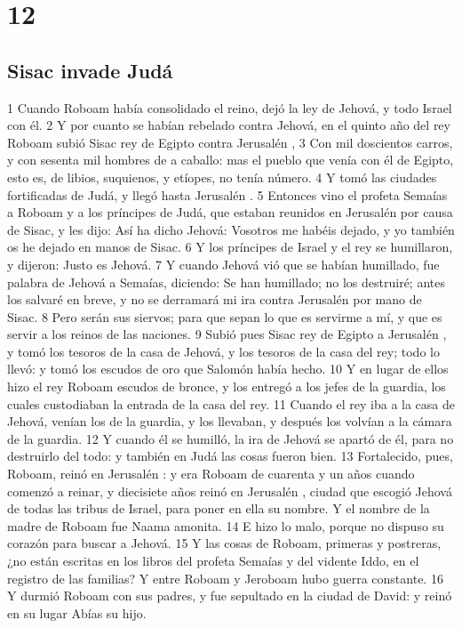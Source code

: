 \chapter{12}

\section*{Sisac invade Judá}

1 Cuando Roboam había consolidado el reino, dejó la ley de Jehová, y todo Israel con él.
2 Y por cuanto se habían rebelado contra Jehová, en el quinto año del rey Roboam subió Sisac rey de Egipto contra Jerusalén ,
3 Con mil doscientos carros, y con sesenta mil hombres de a caballo: mas el pueblo que venía con él de Egipto, esto es, de libios, suquienos, y etíopes, no tenía número.
4 Y tomó las ciudades fortificadas de Judá, y llegó hasta Jerusalén .
5 Entonces vino el profeta Semaías a Roboam y a los príncipes de Judá, que estaban reunidos en Jerusalén  por causa de Sisac, y les dijo: Así ha dicho Jehová: Vosotros me habéis dejado, y yo también os he dejado en manos de Sisac.
6 Y los príncipes de Israel y el rey se humillaron, y dijeron: Justo es Jehová.
7 Y cuando Jehová vió que se habían humillado, fue palabra de Jehová a Semaías, diciendo: Se han humillado; no los destruiré; antes los salvaré en breve, y no se derramará mi ira contra Jerusalén por mano de Sisac.
8 Pero serán sus siervos; para que sepan lo que es servirme a mí, y que es servir a los reinos de las naciones.
9 Subió pues Sisac rey de Egipto a Jerusalén , y tomó los tesoros de la casa de Jehová, y los tesoros de la casa del rey; todo lo llevó: y tomó los escudos de oro que Salomón había hecho. 
10 Y en lugar de ellos hizo el rey Roboam escudos de bronce, y los entregó a los jefes de la guardia, los cuales custodiaban la entrada de la casa del rey.
11 Cuando el rey iba a la casa de Jehová, venían los de la guardia, y los llevaban, y después los volvían a la cámara de la guardia.
12 Y cuando él se humilló, la ira de Jehová se apartó de él, para no destruirlo del todo: y también en Judá las cosas fueron bien.
13 Fortalecido, pues, Roboam, reinó en Jerusalén : y era Roboam de cuarenta y un años cuando comenzó a reinar, y diecisiete años reinó en Jerusalén , ciudad que escogió Jehová de todas las tribus de Israel, para poner en ella su nombre. Y el nombre de la  madre de Roboam fue Naama amonita.
14 E hizo lo malo, porque no dispuso su corazón para buscar a Jehová.
15 Y las cosas de Roboam, primeras y postreras, ¿no están escritas en los libros del profeta Semaías y del vidente Iddo, en el registro de las familias? Y entre Roboam y Jeroboam hubo guerra constante. 
16 Y durmió Roboam con sus padres, y fue sepultado en la ciudad de David: y reinó en su lugar Abías su hijo.

